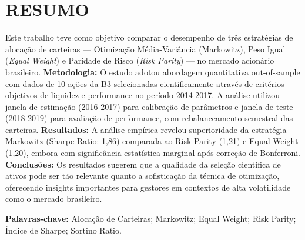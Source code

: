 
\chapter*{RESUMO}

\vspace{1cm}

Este trabalho teve como objetivo comparar o desempenho de três estratégias de alocação de carteiras --- Otimização Média-Variância (Markowitz), Peso Igual (\textit{Equal Weight}) e Paridade de Risco (\textit{Risk Parity}) --- no mercado acionário brasileiro. \textbf{Metodologia:} O estudo adotou abordagem quantitativa out-of-sample com dados de 10 ações da B3 selecionadas cientificamente através de critérios objetivos de liquidez e performance no período 2014-2017. A análise utilizou janela de estimação (2016-2017) para calibração de parâmetros e janela de teste (2018-2019) para avaliação de performance, com rebalanceamento semestral das carteiras. \textbf{Resultados:} A análise empírica revelou superioridade da estratégia Markowitz (Sharpe Ratio: 1,86) comparada ao Risk Parity (1,21) e Equal Weight (1,20), embora com significância estatística marginal após correção de Bonferroni. \textbf{Conclusões:} Os resultados sugerem que a qualidade da seleção científica de ativos pode ser tão relevante quanto a sofisticação da técnica de otimização, oferecendo insights importantes para gestores em contextos de alta volatilidade como o mercado brasileiro.

\vspace{0.5cm}

\noindent
\textbf{Palavras-chave:} Alocação de Carteiras; Markowitz; Equal Weight; Risk Parity; Índice de Sharpe; Sortino Ratio.